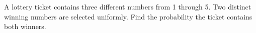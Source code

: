 A lottery ticket contains three different numbers from 1 through 5. Two distinct winning numbers are selected uniformly. Find the probability the ticket contains both winners.
